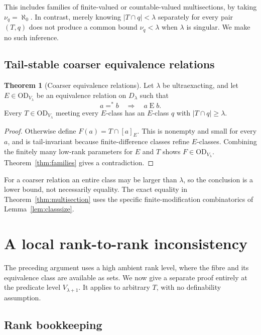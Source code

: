 \documentclass[11pt,letterpaper]{article}
\theoremstyle{definition}
\newtheorem{theorem}[definition]{Theorem}
\numberwithin{equation}{section}
\newcommand{\OD}{\mathrm{OD}}
\newcommand{\eqfin}{\mathrel{=^{*}}}
\begin{document}
This includes families of finite-valued or countable-valued multisections, by taking $\nu_q=\aleph_0$. In contrast, merely knowing $|T\cap q|<\lambda$ separately for every pair $(T,q)$ does not produce a common bound $\nu_q<\lambda$ when $\lambda$ is singular. We make no such inference.

\subsection{Tail-stable coarser equivalence relations}

\begin{theorem}[Coarser equivalence relations]\label{thm:coarser}
Let $\lambda$ be ultraexacting, and let $E\in\OD_{V_\lambda}$ be an equivalence relation on $D_\lambda$ such that
\[
 a\eqfin b\quad\Longrightarrow\quad a\mathrel E b.
\]
Every $T\in\OD_{V_\lambda}$ meeting every $E$-class has an $E$-class $q$ with $|T\cap q|\ge\lambda$.
\end{theorem}

\begin{proof}
Otherwise define $F(a)=T\cap[a]_E$. This is nonempty and small for every $a$, and is tail-invariant because finite-difference classes refine $E$-classes. Combining the finitely many low-rank parameters for $E$ and $T$ shows $F\in\OD_{V_\lambda}$. Theorem~\ref{thm:families} gives a contradiction.
\end{proof}

For a coarser relation an entire class may be larger than $\lambda$, so the conclusion is a lower bound, not necessarily equality. The exact equality in Theorem~\ref{thm:multisection} uses the specific finite-modification combinatorics of Lemma~\ref{lem:classsize}.

\section{A local rank-to-rank inconsistency}\label{sec:local}

The preceding argument uses a high ambient rank level, where the fibre and its equivalence class are available as sets. We now give a separate proof entirely at the predicate level $V_{\lambda+1}$. It applies to arbitrary $T$, with no definability assumption.

\subsection{Rank bookkeeping}
\end{document}
